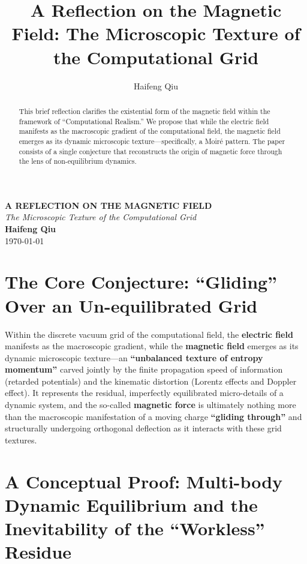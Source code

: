 \documentclass[12pt, a4paper]{article}
\title{A Reflection on the Magnetic Field: The Microscopic Texture of the Computational Grid}
\author{Haifeng Qiu}
\begin{document}
\begin{center}
    {\uppercase{\Large \textbf{A Reflection on the Magnetic Field}}} \\
    \vspace{0.5em}
    {\large \textit{The Microscopic Texture of the Computational Grid}} \\
    \vspace{2em}
    \textbf{Haifeng Qiu} \\
    \today
    \vspace{2em}
\end{center}



\begin{abstract}
This brief reflection clarifies the existential form of the magnetic field within the framework of ``Computational Realism.'' We propose that while the electric field manifests as the macroscopic gradient of the computational field, the magnetic field emerges as its dynamic microscopic texture—specifically, a Moiré pattern. The paper consists of a single conjecture that reconstructs the origin of magnetic force through the lens of non-equilibrium dynamics.
\end{abstract}



\vspace{2em}


\section{The Core Conjecture: ``Gliding'' Over an Un-equilibrated Grid}

Within the discrete vacuum grid of the computational field, the \textbf{electric field} manifests as the macroscopic gradient, while the \textbf{magnetic field} emerges as its dynamic microscopic texture—an \textbf{``unbalanced texture of entropy momentum''} carved jointly by the finite propagation speed of information (retarded potentials) and the kinematic distortion (Lorentz effects and Doppler effect). It represents the residual, imperfectly equilibrated micro-details of a dynamic system, and the so-called \textbf{magnetic force} is ultimately nothing more than the macroscopic manifestation of a moving charge \textbf{``gliding through''} and structurally undergoing orthogonal deflection as it interacts with these grid textures.


\section{A Conceptual Proof: Multi-body Dynamic Equilibrium and the Inevitability of the ``Workless'' Residue}
\end{document}
